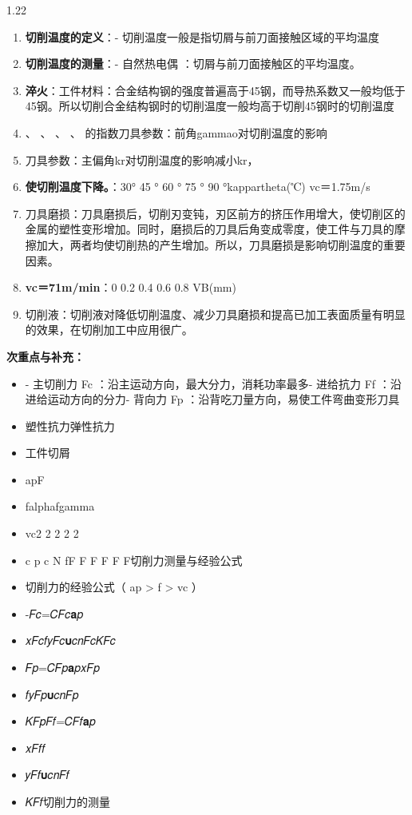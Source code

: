 \documentclass[12pt,a4paper]{article}
\begin{document}
\begin{spacing}{1.22}
\begin{tcolorbox}[colback=yellow!6,colframe=red!55!black,title=重点,left=1mm,right=1mm]
\begin{enumerate}[leftmargin=2.2em,label=\arabic*.]
  \item \textbf{切削温度的定义}：- 切削温度一般是指切屑与前刀面接触区域的平均温度
  \item \textbf{切削温度的测量}：- 自然热电偶 ：切屑与前刀面接触区的平均温度。
  \item \textbf{淬火}：工件材料：合金结构钢的强度普遍高于45钢，而导热系数又一般均低于45钢。所以切削合金结构钢时的切削温度一般均高于切削45钢时的切削温度
  \item 、 、 、 、 的指数刀具参数：前角gammao对切削温度的影响
  \item 刀具参数：主偏角kr对切削温度的影响减小kr，
  \item \textbf{使切削温度下降。}：30° 45 ° 60 ° 75 ° 90 °kappartheta(℃) vc＝1.75m/s
  \item 刀具磨损：刀具磨损后，切削刃变钝，刃区前方的挤压作用增大，使切削区的金属的塑性变形增加。同时，磨损后的刀具后角变成零度，使工件与刀具的摩擦加大，两者均使切削热的产生增加。所以，刀具磨损是影响切削温度的重要因素。
  \item \textbf{vc＝71m/min}：0 0.2 0.4 0.6 0.8 VB(mm)
  \item 切削液：切削液对降低切削温度、减少刀具磨损和提高已加工表面质量有明显的效果，在切削加工中应用很广。
\end{enumerate}
\end{tcolorbox}
\noindent\textbf{次重点与补充：}
\begin{itemize}[leftmargin=2.2em,label=--]
  \item - 主切削力 Fc ：沿主运动方向，最大分力，消耗功率最多- 进给抗力 Ff ：沿进给运动方向的分力- 背向力 Fp ：沿背吃刀量方向，易使工件弯曲变形刀具
  \item 塑性抗力弹性抗力
  \item 工件切屑
  \item apF
  \item falphafgamma
  \item vc2 2 2 2 2
  \item c p c N fF F F F F F切削力测量与经验公式
  \item 切削力的经验公式（ ap > f > vc ）
  \item -𝐹𝑐=𝐶𝐹𝑐𝐚𝑝
  \item 𝑥𝐹𝑐𝑓𝑦𝐹𝑐𝛖𝑐𝑛𝐹𝑐𝐾𝐹𝑐
  \item 𝐹𝑝=𝐶𝐹𝑝𝐚𝑝𝑥𝐹𝑝
  \item 𝑓𝑦𝐹𝑝𝛖𝑐𝑛𝐹𝑝
  \item 𝐾𝐹𝑝𝐹𝑓=𝐶𝐹𝑓𝐚𝑝
  \item 𝑥𝐹𝑓𝑓
  \item 𝑦𝐹𝑓𝛖𝑐𝑛𝐹𝑓
  \item 𝐾𝐹𝑓切削力的测量

\end{itemize}
\end{spacing}
\end{document}
